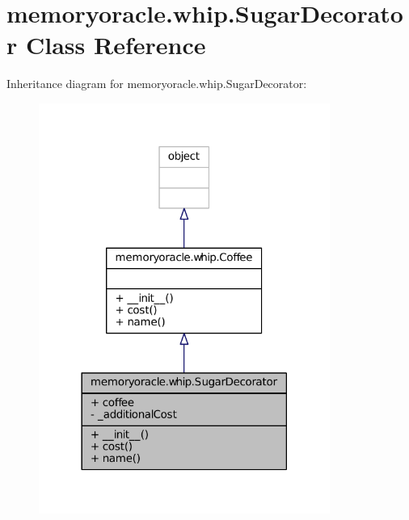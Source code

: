 \hypertarget{classmemoryoracle_1_1whip_1_1SugarDecorator}{}\section{memoryoracle.\+whip.\+Sugar\+Decorator Class Reference}
\label{classmemoryoracle_1_1whip_1_1SugarDecorator}


Inheritance diagram for memoryoracle.\+whip.\+Sugar\+Decorator\+:\nopagebreak
\begin{figure}[H]
\begin{center}
\leavevmode
\includegraphics[width=270pt]{classmemoryoracle_1_1whip_1_1SugarDecorator__inherit__graph}
\end{center}
\end{figure}


